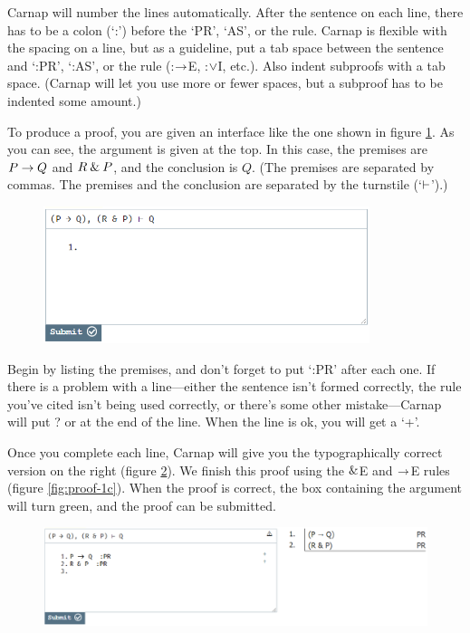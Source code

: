 Carnap will number the lines automatically. After the sentence on each line, there has to be a colon (`:') before the `PR', `AS', or the rule. Carnap is flexible with the spacing on a line, but as a guideline, put a tab space between the sentence and `:PR', `:AS', or the rule (:$\rightarrow$E, :$\vee$I, etc.). Also indent subproofs with a tab space. (Carnap will let you use more or fewer spaces, but a subproof has to be indented some amount.)

To produce a proof, you are given an interface like the one shown in figure \ref{fig:proof-1a}. As you can see, the argument is given at the top. In this case, the premises are $P \rightarrow Q$ and $R \mathbin{\&} P$, and the conclusion is $Q$. (The premises are separated by commas. The premises and the conclusion are separated by the turnstile (`$\vdash$').)

\begin{figure}
\centering
\includegraphics[height=4cm]{textbook--1a.PNG}
\caption{}
\label{fig:proof-1a}
\end{figure}

Begin by listing the premises, and don't forget to put `:PR' after each one. If there is a problem with a line---either the sentence isn't formed correctly, the rule you've cited isn't being used correctly, or there's some other mistake---Carnap will put \textsf{?} or {\selectfont{}\relax}  at the end of the line. When the line is ok, you will get a `+'.

Once you complete each line, Carnap will give you the typographically correct version on the right (figure \ref{fig:proof-1b}). We finish this proof using the $\mathbin{\&}$E and $\rightarrow$E rules (figure \ref{fig:proof-1c}). When the proof is correct, the box containing the argument will turn green, and the proof can be submitted. 

\begin{figure}[h]
\includegraphics[width=13cm]{textbook--1b.PNG}
\caption{}
\label{fig:proof-1b}
\end{figure}

